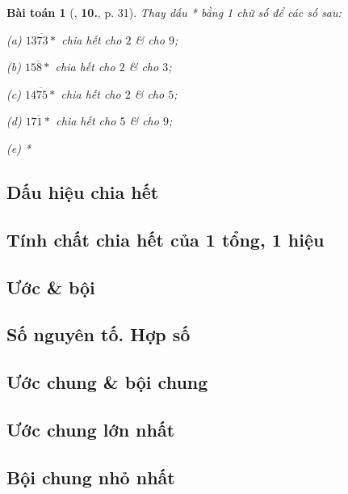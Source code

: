 \documentclass{article}
\numberwithin{equation}{section}
\newtheorem{baitoan}{Bài toán}[section]
\begin{document}
\begin{baitoan}[\cite{Trong_Toan_6_2021}, \textbf{10.}, p. 31]
	Thay dấu * bằng 1 chữ số để các số sau:
	\begin{enumerate*}
		\item[(a)] $\overline{1373*}$ chia hết cho $2$ \& cho $9$;
		\item[(b)] $\overline{158*}$ chia hết cho $2$ \& cho $3$;
		\item[(c)] $\overline{1475*}$ chia hết cho $2$ \& cho $5$;
		\item[(d)] $\overline{171*}$ chia hết cho $5$ \& cho $9$;
		\item[(e)] *
	\end{enumerate*}
\end{baitoan}
















\subsection{Dấu hiệu chia hết}

\subsection{Tính chất chia hết của 1 tổng, 1 hiệu}

\subsection{Ước \& bội}

\subsection{Số nguyên tố. Hợp số}

\subsection{Ước chung \& bội chung}

\subsection{Ước chung lớn nhất}

\subsection{Bội chung nhỏ nhất}
\end{document}

